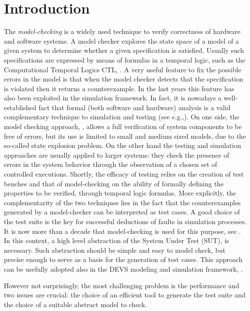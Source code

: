 \documentclass[letterpaper,twocolumn,10pt]{article}
\begin{document}
\section{Introduction}\label{intro}
The {\em model-checking}  is a widely used technique to verify correctness of hardware and software systems.
A model checker explores the state space of a model of a given system to determine whether a given specification is satisfied.
Usually such specifications are expressed by means of formulas in a temporal logic, such as the Computational Temporal
Logics CTL, \cite{CE82}.
A very useful feature to fix the possible errors in the model is that when the model checker detects that the specification is violated then it returns a counterexample. In  the last years this feature  has also been exploited in
the simulation framework.
In fact, it is nowadays a well-established fact that formal (both software and hardware) analysis
is a valid complementary technique to simulation and testing (see e.g.,\cite{DHRPV07}).
On one side, the model checking approach, \cite{CGP99}, allows a full verification of system
components to be free of errors,
but its use is limited to small and medium sized models, due to the so-called state explosion
problem.
On the other hand the testing and simulation approaches \cite{PY} are usually applied to larger systems:
they  check the presence of errors in the system behavior through the observation of a chosen set of controlled executions.
Shortly, the efficacy of testing relies on the creation of test benches and that
of model-checking on the ability of formally defining the properties to be verified,
through temporal logic formulas.
More explicitly, the complementarity of the two techniques lies in the fact that the
counterexamples generated by a model-checker can be interpreted as test cases.
A good choice of the test suite is  the key for successful deductions of faults in
simulation processes. It is now more than a decade that model-checking is used for this purpose,
see \cite{FWA09, WASF07, A95, AB99, ABM98,GH99}.
In this context, a high level abstraction of the System Under Test (SUT),
is necessary.
Such abstraction should be simple and easy to model check,
but precise enough to serve as a basis for the generation of test cases.
This approach can be usefully adopted also in the DEVS modeling and simulation framework, \cite{Z76}.

However not surprisingly, the most challenging problem is the performance and two issues are crucial:
the choice of an efficient tool to generate the test suite and the choice of a suitable  abstract
model to check.
\end{document}
